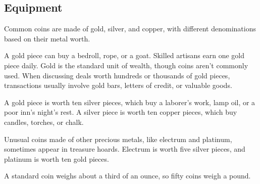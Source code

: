 \subsection{Equipment}\label{equipment}

Common coins are made of gold, silver, and copper, with different
denominations based on their metal worth.

A gold piece can buy a bedroll, rope, or a goat. Skilled artisans earn
one gold piece daily. Gold is the standard unit of wealth, though coins
aren't commonly used. When discussing deals worth hundreds or thousands
of gold pieces, transactions usually involve gold bars, letters of
credit, or valuable goods.

A gold piece is worth ten silver pieces, which buy a laborer's work,
lamp oil, or a poor inn's night's rest. A silver piece is worth ten
copper pieces, which buy candles, torches, or chalk.

Unusual coins made of other precious metals, like electrum and platinum,
sometimes appear in treasure hoards. Electrum is worth five silver
pieces, and platinum is worth ten gold pieces.

A standard coin weighs about a third of an ounce, so fifty coins weigh a
pound.

